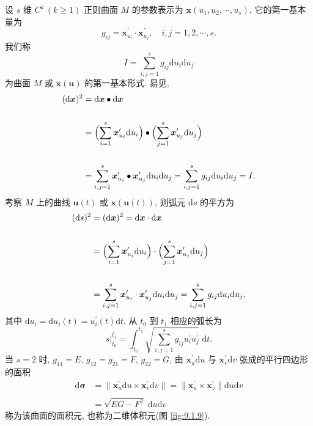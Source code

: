\begin{definition}\label{def:9.1.4}
设 $s$ 维 $C^{k}\,(k \geqslant 1)$ 正则曲面 $M$ 的参数表示为 $\boldsymbol{x}(u_{1}, u_{2}, \cdots, u_{s})$, 它的第一基本量为
\[
  g_{ij} = \boldsymbol{x}_{u_{i}}^{\prime} \cdot \boldsymbol{x}_{u_{j}}^{\prime}, \quad i, j = 1, 2, \cdots, s.
\]
我们称
\[
  I = \sum_{i, j = 1}^{s}g_{ij}\mathrm{d}u_{i}\mathrm{d}u_{j}
\]
为曲面 $M$ 或 $\boldsymbol{x}(\boldsymbol{u})$ 的第一基本形式. 易见,
\begin{align*}
  (\mathrm{d}\boldsymbol{x})^{2} &= \mathrm{d}\boldsymbol{x}\bullet\mathrm{d}\boldsymbol{x} \\\\
  &= \Bigl(\sum_{i=1}^{s}\boldsymbol{x}_{u_{i}}^{\prime}\mathrm{d}u_{i}\Bigr)
     \bullet \Bigl(\sum_{j=1}^{s}\boldsymbol{x}_{u_{j}}^{\prime}\mathrm{d}u_{j}\Bigr) \\\\
  &= \sum_{i, j = 1}^{s}\boldsymbol{x}_{u_{i}}^{\prime}\bullet\boldsymbol{x}_{u_{j}}^{\prime}\mathrm{d}u_{i}\mathrm{d}u_{j}
  = \sum_{i, j = 1}^{s}g_{ij}\mathrm{d}u_{i}\mathrm{d}u_{j} = I.
\end{align*}
考察 $M$ 上的曲线 $\boldsymbol{u}(t)$ 或 $\boldsymbol{x}(\boldsymbol{u}(t))$, 则弧元 $\mathrm{d}s$ 的平方为
\begin{align*}
  (\mathrm{d}s)^{2} &= (\mathrm{d}\boldsymbol{x})^{2} = \mathrm{d}\boldsymbol{x}\cdot\mathrm{d}\boldsymbol{x} \\\\
  &= \Bigl(\sum_{i=1}^{s}\boldsymbol{x}_{u_{i}}^{\prime}\mathrm{d}u_{i}\Bigr)
     \cdot \Bigl(\sum_{j=1}^{s}\boldsymbol{x}_{u_{j}}^{\prime}\mathrm{d}u_{j}\Bigr) \\\\
  &= \sum_{i, j = 1}^{s}\boldsymbol{x}_{u_{i}}^{\prime}\cdot\boldsymbol{x}_{u_{j}}^{\prime}\mathrm{d}u_{i}\mathrm{d}u_{j}
  = \sum_{i, j = 1}^{s}g_{ij}\mathrm{d}u_{i}\mathrm{d}u_{j},
\end{align*}
其中 $\mathrm{d}u_{i} = \mathrm{d}u_{i}(t) = u_{i}^{\prime}(t)\mathrm{d}t$. 从 $t_{0}$ 到 $t_{1}$ 相应的弧长为
\[
  s\bigg|_{t_{0}}^{t_{1}} = \int_{t_{0}}^{t_{1}}\sqrt{\sum_{i, j = 1}^{s}g_{ij}u_{i}^{\prime}u_{j}^{\prime}}\;\mathrm{d}t.
\]
当 $s = 2$ 时, $g_{11} = E$, $g_{12} = g_{21} = F$, $g_{22} = G$, 由 $\boldsymbol{x}_{u}^{\prime}\mathrm{d}u$ 与 $\boldsymbol{x}_{v}^{\prime}\mathrm{d}v$ 张成的平行四边形的面积
\begin{align*}
  \mathrm{d}\boldsymbol{\sigma} &= \bigl\lVert\boldsymbol{x}_{u}^{\prime}\mathrm{d}u \times \boldsymbol{x}_{v}^{\prime}\mathrm{d}v\bigr\rVert
  = \bigl\lVert\boldsymbol{x}_{u}^{\prime} \times \boldsymbol{x}_{v}^{\prime}\bigr\rVert\mathrm{d}u\mathrm{d}v \\\\
  &= \sqrt{EG - F^{2}}\;\mathrm{d}u\mathrm{d}v
\end{align*}
称为该曲面的面积元, 也称为二维体积元(图 \ref{fig:9.1.9}).


\end{definition}
